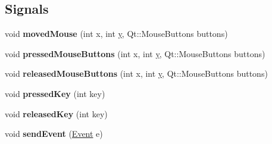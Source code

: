 \subsection*{Signals}
\begin{DoxyCompactItemize}
\item 
\hypertarget{class_d_o_1_1_painting_window_aa284cd282d9c672d56291f539ad864c7}{void {\bfseries moved\-Mouse} (int x, int \hyperlink{group___channel_accessors_gac90c52c5b3a7b2a7e3761e6e84f25778}{y}, Qt\-::\-Mouse\-Buttons buttons)}\label{class_d_o_1_1_painting_window_aa284cd282d9c672d56291f539ad864c7}

\item 
\hypertarget{class_d_o_1_1_painting_window_a211d59c0a6baf6072e762c542472efe6}{void {\bfseries pressed\-Mouse\-Buttons} (int x, int \hyperlink{group___channel_accessors_gac90c52c5b3a7b2a7e3761e6e84f25778}{y}, Qt\-::\-Mouse\-Buttons buttons)}\label{class_d_o_1_1_painting_window_a211d59c0a6baf6072e762c542472efe6}

\item 
\hypertarget{class_d_o_1_1_painting_window_aa6e288186f3b4d8668cbcb77d4d5cc71}{void {\bfseries released\-Mouse\-Buttons} (int x, int \hyperlink{group___channel_accessors_gac90c52c5b3a7b2a7e3761e6e84f25778}{y}, Qt\-::\-Mouse\-Buttons buttons)}\label{class_d_o_1_1_painting_window_aa6e288186f3b4d8668cbcb77d4d5cc71}

\item 
\hypertarget{class_d_o_1_1_painting_window_af3120a375a321654553779cf030a9508}{void {\bfseries pressed\-Key} (int key)}\label{class_d_o_1_1_painting_window_af3120a375a321654553779cf030a9508}

\item 
\hypertarget{class_d_o_1_1_painting_window_ac80bf1948c09a26181b72cb51f4ea4c3}{void {\bfseries released\-Key} (int key)}\label{class_d_o_1_1_painting_window_ac80bf1948c09a26181b72cb51f4ea4c3}

\item 
\hypertarget{class_d_o_1_1_painting_window_a497371cbad118b80dc07aa5c288f2573}{void {\bfseries send\-Event} (\hyperlink{struct_d_o_1_1_event}{Event} e)}\label{class_d_o_1_1_painting_window_a497371cbad118b80dc07aa5c288f2573}

\end{DoxyCompactItemize}
